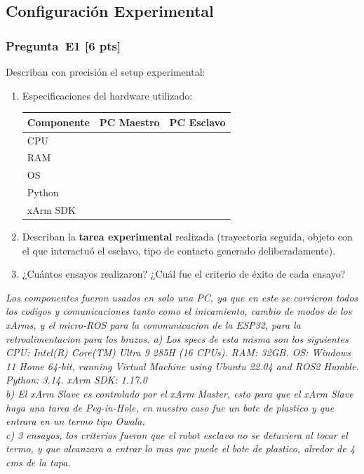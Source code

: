 \documentclass[journal,10pt,twoside]{IEEEtran}
\newcommand{\answerline}[1][3cm]{\underline{\hspace{#1}}}
\newcommand{\pts}[1]{\textbf{\color{tec_red}[#1 pts]}}
\newcommand{\TODO}[1]{\begin{todobox}[Respuesta del equipo]
  \textit{#1}
\end{todobox}}
\begin{document}
\subsection{Configuración Experimental}

\subsubsection*{Pregunta~E1 \pts{6}}
Describan con precisión el setup experimental:
\begin{enumerate}[label=(\alph*)]
  \item Especificaciones del hardware utilizado:
  \begin{center}
  \small
  \begin{tabular}{lll}
    \toprule
    \textbf{Componente} & \textbf{PC Maestro} & \textbf{PC Esclavo} \\
    \midrule
    CPU   & \answerline & \answerline \\
    RAM   & \answerline & \answerline \\
    OS    & \answerline & \answerline \\
    Python & \answerline & \answerline \\
    xArm SDK & \answerline & \answerline \\
    \bottomrule
  \end{tabular}
  \end{center}
  \item Describan la \textbf{tarea experimental} realizada
        (trayectoria seguida, objeto con el que interactuó el esclavo,
        tipo de contacto generado deliberadamente).
  \item ¿Cuántos ensayos realizaron? ¿Cuál fue el criterio de éxito
        de cada ensayo?
\end{enumerate}

\TODO{Los componentes fueron usados en solo una PC, ya que en este se corrieron todos los codigos y comunicaciones tanto como el inicamiento, cambio de modos de los xArms, y el micro-ROS para la communicacion de la ESP32, para la retroalimentacion para los brazos. a) Los specs de esta misma son los siguientes CPU: Intel(R) Core(TM) Ultra 9 285H (16 CPUs). RAM: 32GB. OS: Windows 11 Home 64-bit, running Virtual Machine using Ubuntu 22.04 and ROS2 Humble. Python: 3.14. xArm SDK: 1.17.0\\ 
b) El xArm Slave es controlado por el xArm Master, esto para que el xArm Slave haga una tarea de Peg-in-Hole, en nuestro caso fue un bote de plastico y que entrara en un termo tipo Owala.\\ 
c) 3 ensayos, los criterios fueron que el robot esclavo no se detuviera al tocar el termo, y que alcanzara a entrar lo mas que puede el bote de plastico, alredor de 4 cms de la tapa. 
}
\end{document}

